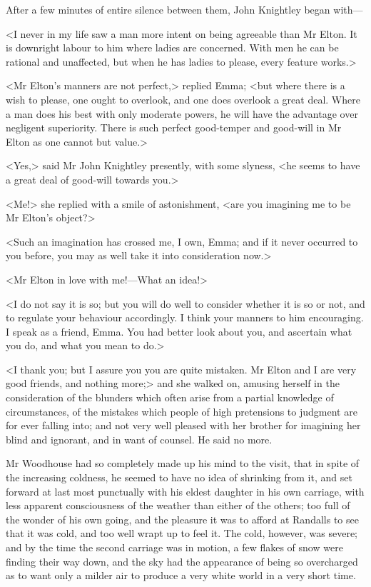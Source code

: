 After a few minutes of entire silence between them, John Knightley began with—

<I never in my life saw a man more intent on being agreeable than Mr Elton. It is downright labour to him where ladies are concerned. With men he can be rational and unaffected, but when he has ladies to please, every feature works.>

<Mr Elton's manners are not perfect,> replied Emma; <but where there is a wish to please, one ought to overlook, and one does overlook a great deal. Where a man does his best with only moderate powers, he will have the advantage over negligent superiority. There is such perfect good-temper and good-will in Mr Elton as one cannot but value.>

<Yes,> said Mr John Knightley presently, with some slyness, <he seems to have a great deal of good-will towards you.>

<Me!> she replied with a smile of astonishment, <are you imagining me to be Mr Elton's object?>

<Such an imagination has crossed me, I own, Emma; and if it never occurred to you before, you may as well take it into consideration now.>

<Mr Elton in love with me!—What an idea!>

<I do not say it is so; but you will do well to consider whether it is so or not, and to regulate your behaviour accordingly. I think your manners to him encouraging. I speak as a friend, Emma. You had better look about you, and ascertain what you do, and what you mean to do.>

<I thank you; but I assure you you are quite mistaken. Mr Elton and I are very good friends, and nothing more;> and she walked on, amusing herself in the consideration of the blunders which often arise from a partial knowledge of circumstances, of the mistakes which people of high pretensions to judgment are for ever falling into; and not very well pleased with her brother for imagining her blind and ignorant, and in want of counsel. He said no more.

Mr Woodhouse had so completely made up his mind to the visit, that in spite of the increasing coldness, he seemed to have no idea of shrinking from it, and set forward at last most punctually with his eldest daughter in his own carriage, with less apparent consciousness of the weather than either of the others; too full of the wonder of his own going, and the pleasure it was to afford at Randalls to see that it was cold, and too well wrapt up to feel it. The cold, however, was severe; and by the time the second carriage was in motion, a few flakes of snow were finding their way down, and the sky had the appearance of being so overcharged as to want only a milder air to produce a very white world in a very short time.

